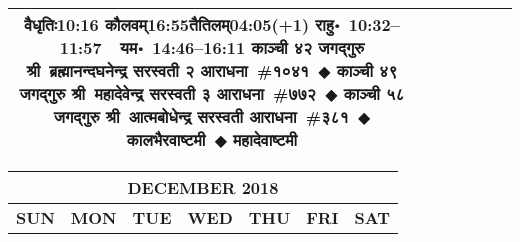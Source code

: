 \documentclass[a3paper,12pt,landscape]{article}
\newcommand{\eventsep}{~$\Diamondblack$ }
\newcommand{\To}{\hspace{1pt}\raisebox{0pt}{\tiny\RIGHTarrow}\hspace{1pt}}
\newcommand{\rahuyama}[2]{%
{राहु॰~\textsf{#1}~~यम॰~\textsf{#2}}
}
\begin{document}
\begin{center}
\begin{tabular}{|c|c|c|c|c|c|c|}
{{\mbox{वैधृतिः\To{}\textsf{10:16\hspace{2ex}}}}%
{\mbox{कौलवम्\To{}\textsf{16:55\hspace{2ex}}}\mbox{तैतिलम्\To{}\textsf{04:05(+1)\hspace{2ex}}}}}%
{\rahuyama{10:32--11:57}{14:46--16:11}}%
{काञ्ची ४२ जगद्गुरु श्री~ब्रह्मानन्दघनेन्द्र सरस्वती २ आराधना~\#{१०४१}\eventsep काञ्ची ४९ जगद्गुरु श्री~महादेवेन्द्र सरस्वती ३ आराधना~\#{७७२}\eventsep काञ्ची ५८ जगद्गुरु श्री~आत्मबोधेन्द्र सरस्वती आराधना~\#{३८१}\eventsep कालभैरवाष्टमी\eventsep महादेवाष्टमी}
&
\\ \hline
\end{tabular}



\begin{tabular}{|c|c|c|c|c|c|c|}
\multicolumn{7}{c}{\Large \bfseries \sffamily DECEMBER 2018}\\[3mm]
\hline
\textbf{\textsf{SUN}} & \textbf{\textsf{MON}} & \textbf{\textsf{TUE}} & \textbf{\textsf{WED}} & \textbf{\textsf{THU}} & \textbf{\textsf{FRI}} & \textbf{\textsf{SAT}} \\ \hline


\end{tabular}
\end{center}
\end{document}
